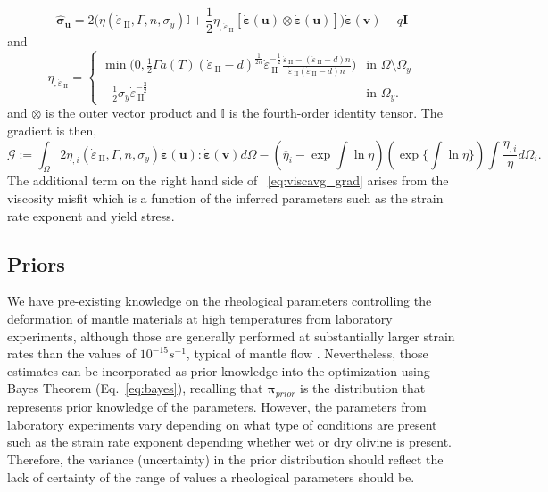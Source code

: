 \documentclass[12pt]{article}
\newcommand{\IIinv}{{\dot\varepsilon}_{\mathrm{\!\!\:II}}}
\newcommand{\uu}{{\ensuremath{\boldsymbol{u}}}}
\newcommand{\vv}{{\ensuremath{\boldsymbol{v}}}}
\newcommand{\ppi}{{\ensuremath{\boldsymbol{\pi}}}}
\newcommand{\ssigma}{{\ensuremath{\boldsymbol{\sigma}}}}
\newcommand{\strain}{{\ensuremath{\dot{\boldsymbol{\varepsilon}}}}}
\begin{document}
{\begin{equation}\label{eq:sigma_hat}
\hat\ssigma_\uu  = 2 \Big(\eta(\IIinv,\Gamma, n,
\sigma_y)\mathbb{I}+\frac{1}{2} \eta_{,\IIinv} [\strain(\uu)\otimes
      \strain(\uu)]\Big)\strain(\vv) -q\textbf{I}
\end{equation}
and
\begin{equation}
  \eta_{,\IIinv} \!\!=\!\!
  \begin{cases}
   \min\!\Big(0, \frac{1}{2}\Gamma
   a(T)(\IIinv-d)^{\frac{1}{2n}}\IIinv^{-\frac{1}{2}}\frac{\IIinv-(\IIinv-d)n}{\IIinv(\IIinv-d)n}\Big)
   &\text{in } \Omega\setminus\Omega_y 
   \\
   -\frac{1}{2}\sigma_{y}\IIinv^{-\frac{3}{2}}  &\text{in } \Omega_y.
  \end{cases}
\end{equation}
 and $\otimes$ is the outer vector product and $\mathbb{I}$ is the fourth-order identity tensor. The gradient is then, 
\begin{equation}
\mathcal G:= \int_{\Omega} 2 \eta_{,i}(\IIinv, \Gamma, n, \sigma_y)\strain(\uu):\strain(\vv) d\Omega - (\overline{\eta}_i-\exp\int\ln \eta)(\exp\{\int\ln \eta\})\int\frac{\eta_{,i}}{\eta}d\Omega_i.\
\label{eq:viscavg_grad}
\end{equation}
The additional term on the right hand side of ~\eqref{eq:viscavg_grad} arises from the viscosity misfit which is a function of the inferred parameters such as the strain rate exponent and yield stress.


\subsection*{Priors}
 We have pre-existing knowledge on the rheological parameters controlling the deformation of mantle materials at high temperatures from laboratory experiments\cite{ranalli1995rheology}, 
although those are generally performed at substantially larger strain rates than the values of $10^{-15}s^{-1}$, typical of mantle flow \citep{korenaga2008new}. Nevertheless,  those estimates can be  incorporated as prior knowledge into the optimization using Bayes Theorem (Eq.~\eqref{eq:bayes}), recalling that $\ppi_{prior}$ is the distribution that represents prior knowledge of the parameters. However, the parameters from laboratory experiments vary depending on what type of conditions are present such as the strain rate exponent depending whether wet or dry olivine is present. Therefore, the variance (uncertainty) in the prior distribution should reflect the lack of certainty of the range of values a rheological parameters should be.

}
\end{document}
